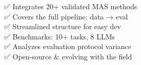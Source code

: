\documentclass[preview]{standalone}
\begin{document}
✅ Integrates 20+ validated MAS methods\\✅ Covers the full pipeline: data → eval\\✅ Streamlined structure for easy dev\\✅ Benchmarks: 10+ tasks, 8 LLMs\\✅ Analyzes evaluation protocol variance\\✅ Open-source & evolving with the field\\
\end{document}
